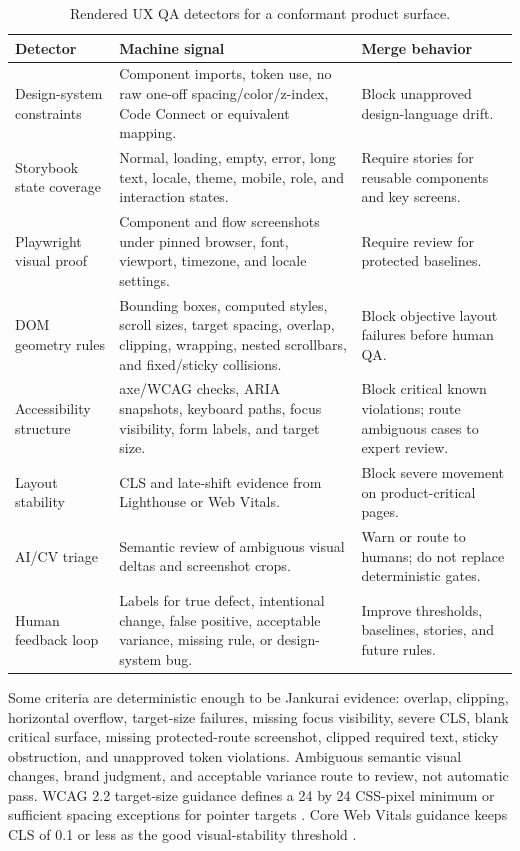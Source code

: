 \begin{table}[t]
\caption{Rendered UX QA detectors for a conformant product surface.}
\label{tab:rendered-ux-qa}
\centering
\small
\begin{tabularx}{\textwidth}{L{0.19\textwidth} Y Y}
\toprule
\textbf{Detector} & \textbf{Machine signal} & \textbf{Merge behavior} \\
\midrule
Design-system constraints & Component imports, token use, no raw one-off spacing/color/z-index, Code Connect or equivalent mapping. & Block unapproved design-language drift. \\
Storybook state coverage & Normal, loading, empty, error, long text, locale, theme, mobile, role, and interaction states. & Require stories for reusable components and key screens. \\
Playwright visual proof & Component and flow screenshots under pinned browser, font, viewport, timezone, and locale settings. & Require review for protected baselines. \\
DOM geometry rules & Bounding boxes, computed styles, scroll sizes, target spacing, overlap, clipping, wrapping, nested scrollbars, and fixed/sticky collisions. & Block objective layout failures before human QA. \\
Accessibility structure & axe/WCAG checks, ARIA snapshots, keyboard paths, focus visibility, form labels, and target size. & Block critical known violations; route ambiguous cases to expert review. \\
Layout stability & CLS and late-shift evidence from Lighthouse or Web Vitals. & Block severe movement on product-critical pages. \\
AI/CV triage & Semantic review of ambiguous visual deltas and screenshot crops. & Warn or route to humans; do not replace deterministic gates. \\
Human feedback loop & Labels for true defect, intentional change, false positive, acceptable variance, missing rule, or design-system bug. & Improve thresholds, baselines, stories, and future rules. \\
\bottomrule
\end{tabularx}
\end{table}

Some criteria are deterministic enough to be Jankurai evidence: overlap, clipping, horizontal overflow, target-size failures, missing focus visibility, severe CLS, blank critical surface, missing protected-route screenshot, clipped required text, sticky obstruction, and unapproved token violations. Ambiguous semantic visual changes, brand judgment, and acceptable variance route to review, not automatic pass. WCAG 2.2 target-size guidance defines a 24 by 24 CSS-pixel minimum or sufficient spacing exceptions for pointer targets \cite{wcagTargetSizeMinimum2026}. Core Web Vitals guidance keeps CLS of 0.1 or less as the good visual-stability threshold \cite{webDevCls2025}.

